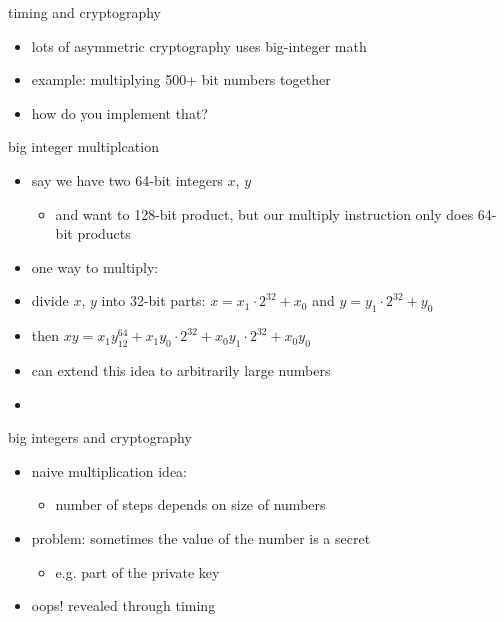 \usetikzlibrary{calc}

\begin{frame}{timing and cryptography}
    \begin{itemize}
    \item lots of asymmetric cryptography uses big-integer math
    \item example: multiplying 500+ bit numbers together
    \vspace{.5cm}
    \item how do you implement that?
    \end{itemize}
\end{frame}

\begin{frame}{big integer multiplcation}
    \begin{itemize}
    \item say we have two 64-bit integers $x$, $y$
        \begin{itemize}
        \item and want to 128-bit product, but our multiply instruction only does 64-bit products
        \end{itemize}
    \item one way to multiply:
    \vspace{.5cm}
    \item divide $x$, $y$ into 32-bit parts: $x=x_1\cdot2^{32}+x_0$ and $y=y_1\cdot2^{32}+y_0$
    \item then $xy = x_1y_12^{64}+x_1y_0\cdot2^{32}+x_0y_1\cdot2^{32}+x_0y_0$
    \vspace{.5cm}
    \item<2-> can extend this idea to arbitrarily large numbers
    \item<2-> 
    \end{itemize}
\end{frame}

\begin{frame}{big integers and cryptography}
    \begin{itemize}
    \item naive multiplication idea:
        \begin{itemize}
        \item number of steps depends on size of numbers
        \end{itemize}
    \item problem: sometimes the value of the number is a secret
        \begin{itemize}
        \item e.g. part of the private key
        \end{itemize}
    \item oops! revealed through timing
    \end{itemize}
\end{frame}

